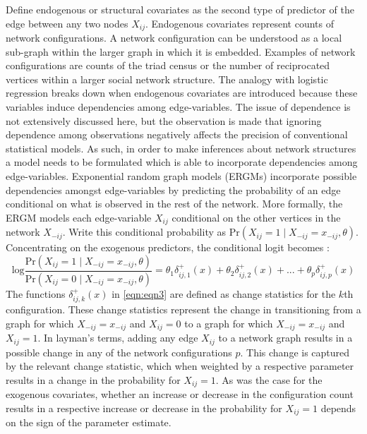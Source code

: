 \documentclass[a4paper, man]{apa6}
\begin{document}
Define endogenous or structural covariates as the second type of predictor of the edge between any two nodes $X_{ij}$. Endogenous covariates represent counts of network configurations. A network configuration can be understood as a local sub-graph within the larger graph in which it is embedded. Examples of network configurations are counts of the triad census or the number of reciprocated vertices within a larger social network structure. The analogy with logistic regression breaks down when endogenous covariates are introduced because these variables induce dependencies among edge-variables. The issue of dependence is not extensively discussed here, but the observation is made that ignoring dependence among observations negatively affects the precision of conventional statistical models. As such, in order to make inferences about network structures a model needs to be formulated which is able to incorporate dependencies among edge-variables. Exponential random graph models (ERGMs) incorporate possible dependencies amongst edge-variables by predicting the probability of an edge conditional on what is observed in the rest of the network. More formally, the ERGM models each edge-variable $X_{ij}$ conditional on the other vertices in the network $X_{-ij}$. Write this conditional probability as $\text{Pr}(X_{ij}=1 \mid X_{−ij} = x_{−ij}, \theta)$. Concentrating on the exogenous predictors, the conditional logit becomes : \begin{equation} \label{eqn:eqn3} \text{log}\frac{\text{Pr}(X_{ij} = 1 \mid X_{-ij} = x_{-ij}, \theta)}{\text{Pr}(X_{ij} = 0 \mid X_{-ij} = x_{-ij}, \theta)} = \theta_{1}\delta_{ij,1}^{+}(x) + \theta_{2}\delta_{ij,2}^{+}(x) + ... + \theta_{p}\delta_{ij, p}^{+}(x) \end{equation} The functions $\delta_{ij,k}^{+}(x)$ in \eqref{eqn:eqn3} are defined as change statistics for the $k$th configuration. These change statistics represent the change in transitioning from a graph for which $X_{−ij} = x_{−ij}$ and $X_{ij} = 0$ to a graph for which $X_{−ij} = x_{−ij}$ and $X_{ij} = 1$. In layman's terms,  adding any edge $X_{ij}$ to a network graph results in a possible change in any of the network configurations $p$. \clearpage \noindent This change is captured by the relevant change statistic, which when weighted by a respective parameter results in a change in the probability for $X_{ij} = 1$. As was the case for the exogenous covariates, whether an increase or decrease in the configuration count results in a respective increase or decrease in the probability for $X_{ij} = 1$ depends on the sign of the parameter estimate.  
\end{document}
